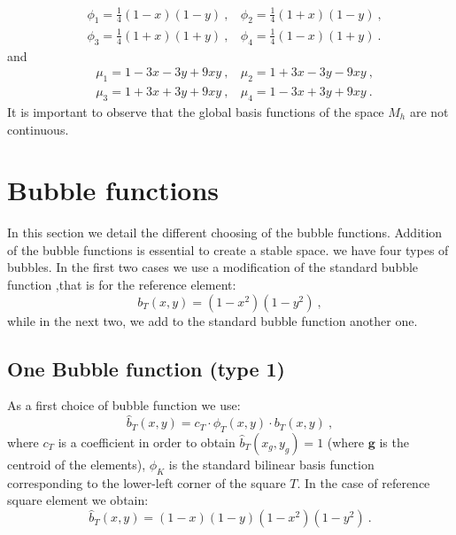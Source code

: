 \documentclass[preprint,12pt,authoryear]{elsarticle}
\begin{document}
%
\begin{equation}
\begin{split}
&\phi_{1}=\frac{1}{4}(1-x)(1-y) \:, \:\:\:\: \phi_{2}=\frac{1}{4}(1+x)(1-y) \:,\\
&\phi_{3}=\frac{1}{4}(1+x)(1+y) \:, \:\:\:\: \phi_{4}=\frac{1}{4}(1-x)(1+y) \:.
\end{split}
\end{equation}   
and
\begin{equation}
\begin{split}
&\mu_{1} = 1 - 3x - 3y + 9xy \:, \:\:\:\: \mu_{2} = 1 + 3x - 3y - 9xy \:,\\
&\mu_{3} = 1 + 3x + 3y + 9xy \:, \:\:\:\: \mu_{4} = 1 - 3x + 3y + 9xy \:.
\end{split}
\end{equation}
It is important to observe that the global basis functions of the space $M_{h}$ are not continuous.
   
\section{Bubble functions}
In this section we detail the different choosing of the bubble functions. Addition of the bubble functions is essential to create a stable space. we have four types of bubbles.
In the first two cases we use a modification of the standard bubble function ,that is for the reference element:
\begin{equation}\label{eq:standard_bubble_fun}
b_{T}(x,y) = (1-x^{2})(1-y^{2})\:,
\end{equation}
while in the next two, we add to the standard bubble function another one.
\subsection{One Bubble function (type 1)}
As a first choice of bubble function we use:
\begin{equation}\label{eq:bubble_1}
\hat{b}_{T}(x,y) = c_{T}\cdot\phi_{T}(x,y)\cdot b_{T}(x,y)\:, 
\end{equation}
where $c_{T}$ is a coefficient in order to obtain $\hat{b}_{T}(x_{g},y_{g}) = 1$ (where $\bm{g}$ is the centroid of the elements), $\phi_{K}$ is the standard bilinear basis function corresponding to the lower-left corner of the square $T$.
In the case of reference square element we obtain:
\begin{equation} \label{eq:bubble_1_ref}
\hat{b}_{T}(x,y) = (1-x)(1-y)(1-x^{2})(1-y^{2})\:.
\end{equation}
\end{document}
